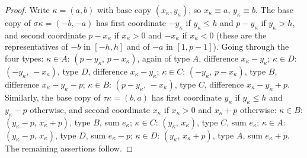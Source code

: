 \documentclass[11pt]{article}
\theoremstyle{remark}
\begin{document}
\begin{proof}
Write $\kappa=(a,b)$ with base copy $(x_\kappa,y_\kappa)$, so $x_\kappa\equiv a$, $y_\kappa\equiv b$.  The base copy of
$\sigma\kappa=(-b,-a)$ has first coordinate $-y_\kappa$ if $y_\kappa\le h$ and $p-y_\kappa$ if $y_\kappa>h$, and second
coordinate $p-x_\kappa$ if $x_\kappa>0$ and $-x_\kappa$ if $x_\kappa<0$ (these are the representatives of $-b$ in
$[-h,h]$ and of $-a$ in $[1,p-1]$).  Going through the four types:
$\kappa\in A$: $(p-y_\kappa,\,p-x_\kappa)$, again of type $A$, difference $x_\kappa-y_\kappa$;
$\kappa\in D$: $(-y_\kappa,\,-x_\kappa)$, type $D$, difference $x_\kappa-y_\kappa$;
$\kappa\in C$: $(-y_\kappa,\,p-x_\kappa)$, type $B$, difference $x_\kappa-y_\kappa-p$;
$\kappa\in B$: $(p-y_\kappa,\,-x_\kappa)$, type $C$, difference $x_\kappa-y_\kappa+p$.
Similarly, the base copy of $\tau\kappa=(b,a)$ has first coordinate $y_\kappa$ if $y_\kappa\le h$ and $y_\kappa-p$
otherwise, and second coordinate $x_\kappa$ if $x_\kappa>0$ and $x_\kappa+p$ otherwise:
$\kappa\in B$: $(y_\kappa-p,\,x_\kappa+p)$, type $B$, sum $e_\kappa$;
$\kappa\in C$: $(y_\kappa,\,x_\kappa)$, type $C$, sum $e_\kappa$;
$\kappa\in A$: $(y_\kappa-p,\,x_\kappa)$, type $D$, sum $e_\kappa-p$;
$\kappa\in D$: $(y_\kappa,\,x_\kappa+p)$, type $A$, sum $e_\kappa+p$.
The remaining assertions follow.
\end{proof}
\end{document}

